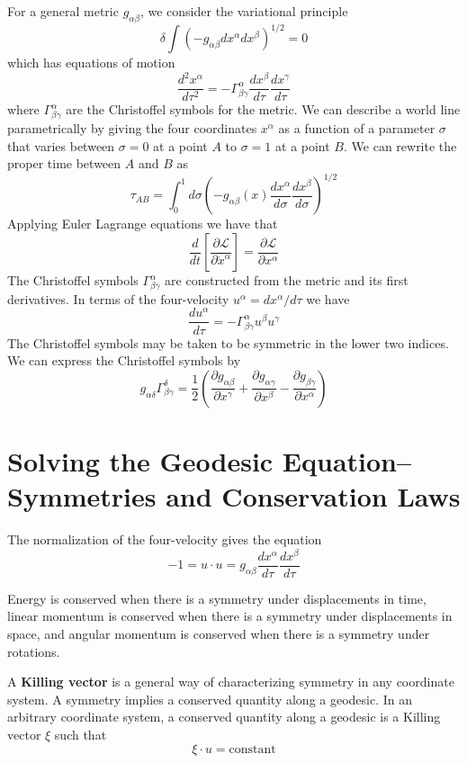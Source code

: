 For a general metric $g_{\alpha\beta}$, we consider the variational principle $$\delta\int(-g_{\alpha\beta}dx^{\alpha}dx^{\beta})^{1/2} = 0$$
which has equations of motion $$\frac{d^2x^{\alpha}}{d\tau^2} = -\Gamma_{\beta\gamma}^{\alpha}\frac{dx^{\beta}}{d\tau}\frac{dx^{\gamma}}{d\tau}$$
where $\Gamma_{\beta\gamma}^{\alpha}$ are the Christoffel symbols for the metric. We can describe a world line parametrically by giving the four coordinates $x^{\alpha}$ as a function of a parameter $\sigma$ that varies between $\sigma = 0$ at a point $A$ to $\sigma = 1$ at a point $B$. We can rewrite the proper time between $A$ and $B$ as $$\tau_{AB} = \int_0^1d\sigma\left(-g_{\alpha\beta}(x)\frac{dx^{\alpha}}{d\sigma}\frac{dx^{\beta}}{d\sigma}\right)^{1/2}$$
Applying Euler Lagrange equations we have that $$\frac{d}{dt}\left[\frac{\partial \mathcal{L}}{\partial \dot{x}^{\alpha}}\right] = \frac{\partial\mathcal{L}}{\partial x^{\alpha}}$$
The Christoffel symbols $\Gamma_{\beta\gamma}^{\alpha}$ are constructed from the metric and its first derivatives. In terms of the four-velocity $u^{\alpha} = dx^{\alpha}/d\tau$ we have $$\frac{du^{\alpha}}{d\tau} = -\Gamma_{\beta\gamma}^{\alpha}u^{\beta}u^{\gamma}$$
The Christoffel symbols may be taken to be symmetric in the lower two indices. We can express the Christoffel symbols by \begin{equation*}
    g_{\alpha\delta}\Gamma_{\beta\gamma}^{\delta} = \frac{1}{2}\left(\frac{\partial g_{\alpha\beta}}{\partial x^{\gamma}} + \frac{\partial g_{\alpha\gamma}}{\partial x^{\beta}} - \frac{\partial g_{\beta\gamma}}{\partial x^{\alpha}}\right)
\end{equation*}


\section{Solving the Geodesic Equation--Symmetries and Conservation Laws}
\label{sec:solvGeodEq}

The normalization of the four-velocity gives the equation $$-1 = u\cdot u = g_{\alpha\beta}\frac{dx^{\alpha}}{d\tau}\frac{dx^{\beta}}{d\tau}$$

Energy is conserved when there is a symmetry under displacements in time, linear momentum is conserved when there is a symmetry under displacements in space, and angular momentum is conserved when there is a symmetry under rotations.

A \textbf{Killing vector} is a general way of characterizing symmetry in any coordinate system. A symmetry implies a conserved quantity along a geodesic. In an arbitrary coordinate system, a conserved quantity along a geodesic is a Killing vector $\xi$ such that $$\xi\cdot u = \text{constant}$$


